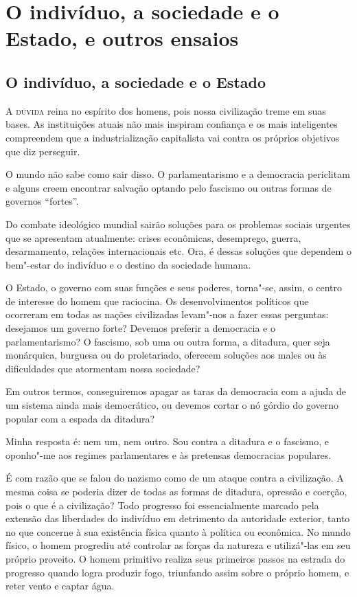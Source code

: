 \part{O indivíduo, a sociedade e o Estado, e outros ensaios}

\chapter{O indivíduo, a sociedade e o Estado}

\textsc{A dúvida} reina no espírito dos homens, pois nossa civilização treme em
suas bases. As instituições atuais não mais inspiram confiança e os
mais inteligentes compreendem que a industrialização capitalista vai
contra os próprios objetivos que diz perseguir.

O mundo não sabe como sair disso. O parlamentarismo e a democracia
periclitam e alguns creem encontrar salvação optando pelo fascismo ou
outras formas de governos “fortes”.

Do combate ideológico mundial sairão soluções para os problemas sociais
urgentes que se apresentam atualmente: crises econômicas, desemprego,
guerra, desarmamento, relações internacionais etc. Ora, é dessas
soluções que dependem o bem"-estar do indivíduo e o destino da
sociedade humana.

O Estado, o governo com suas funções e seus poderes, torna"-se, assim,
o centro de interesse do homem que raciocina. Os desenvolvimentos
políticos que ocorreram em todas as nações civilizadas levam"-nos a
fazer essas perguntas: desejamos um governo forte? Devemos preferir a
democracia e o parlamentarismo? O fascismo, sob uma ou outra forma, a
ditadura, quer seja monárquica, burguesa ou do proletariado,
oferecem soluções aos males ou às dificuldades que atormentam nossa
sociedade?

Em outros termos, conseguiremos apagar as taras da democracia com a
ajuda de um sistema ainda mais democrático, ou devemos cortar o
nó górdio do governo popular com a espada da ditadura?

Minha resposta é: nem um, nem outro. Sou contra a ditadura e o fascismo,
e oponho"-me aos regimes parlamentares e às pretensas democracias
populares.

É com razão que se falou do nazismo como de um ataque contra a
civilização. A mesma coisa se poderia dizer de todas as formas de
ditadura, opressão e coerção, pois o que é a civilização? Todo
progresso foi essencialmente marcado pela extensão das liberdades do
indivíduo em detrimento da autoridade exterior, tanto no que concerne à
sua existência física quanto à política ou econômica. No mundo físico, o
homem progrediu até controlar as forças da natureza e utilizá"-las em
seu próprio proveito. O homem primitivo realiza seus primeiros passos
na estrada do progresso quando logra produzir fogo, triunfando assim
sobre o próprio homem, e reter vento e captar água.

